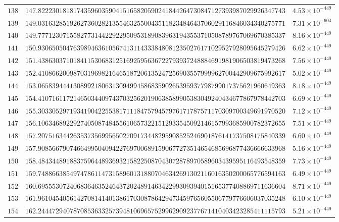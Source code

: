 \documentclass[12pt,reqno]{amsart}
\theoremstyle{remark}
\begin{document}
\begin{longtable}{clc}
$138$ & $147.8222301818174359603590415165820590241844264730847127393987029926347743$ & $4.53\times 10^{-449}$ \\
$139$ & $149.0316328519262736028213554632550043511823484643706029116846034340275771$ & $7.31\times 10^{-604}$ \\
$140$ & $149.7771230715582773144229229509531890839631943553710508789767069670385337$ & $8.16\times 10^{-449}$ \\
$141$ & $150.9306505047639894636105674131143338480812350276171029527928095645279426$ & $6.62\times 10^{-449}$ \\
$142$ & $151.4386303710184115306831251692595636722793937248884691981906503819473268$ & $7.56\times 10^{-449}$ \\
$143$ & $152.4108662009870319698216465187206135247256903557999962700442909675992617$ & $5.02\times 10^{-449}$ \\
$144$ & $153.0658394441308992180631309499458683590265395937798799017375621960649363$ & $8.18\times 10^{-449}$ \\
$145$ & $154.4107161172146503440974370325620190638589905383049240434677867978442703$ & $6.69\times 10^{-449}$ \\
$146$ & $155.3033052971934190422553817111847579457976171787571170309700349691970520$ & $7.12\times 10^{-449}$ \\
$147$ & $156.1063468922927405087484556106573221512933545092146157993685900782372655$ & $7.51\times 10^{-449}$ \\
$148$ & $157.2075163442635373569956502709173448295908525246901876141737508175840339$ & $6.60\times 10^{-449}$ \\
$149$ & $157.9085667907466499504094227697006891590677273514654685696877436666633968$ & $5.16\times 10^{-449}$ \\
$150$ & $158.4843448918837596448936932158225087043072878970589603439595116493548359$ & $7.73\times 10^{-449}$ \\
$151$ & $159.7488663854974786114731589601318807046342691302116016350200065776594163$ & $6.49\times 10^{-449}$ \\
$152$ & $160.6955530724068364635246437202489146342299309394015165377408869711636604$ & $8.71\times 10^{-449}$ \\
$153$ & $161.9610454056142708141401386170308786429473459765605506779776606037035248$ & $6.10\times 10^{-449}$ \\
$154$ & $162.2444729407870853633257394810696575299629092377671410403423285411115793$ & $5.21\times 10^{-449}$ \\

\end{longtable}
\end{document}
